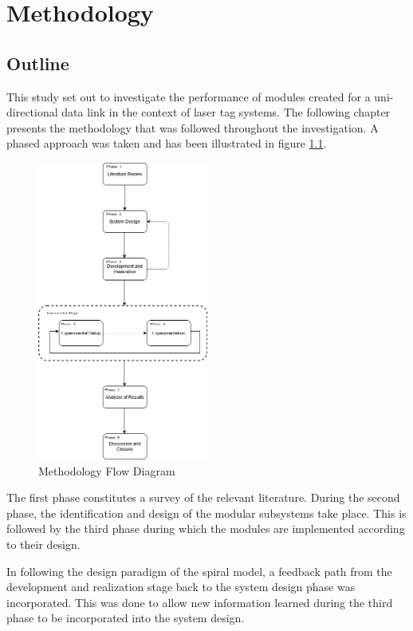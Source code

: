 \chapter{Methodology}
\label{ch_methodology}

\section{Outline}

This study set out to investigate the performance of modules created for a uni-directional data link in the context of laser tag systems. The following chapter presents the methodology that was followed throughout the investigation. A phased approach was taken and has been illustrated in figure \ref{fig:methodology_overview}.

\begin{figure}[H]
	\centering
	\includegraphics[width=0.5\textwidth]{figures/methodology/methodology}
	\caption{Methodology Flow Diagram}
	\label{fig:methodology_overview}
\end{figure}

The first phase constitutes a survey of the relevant literature. During the second phase, the identification and design of the modular subsystems take place. This is followed by the third phase during which the modules are implemented according to their design.

In following the design paradigm of the spiral model, a feedback path from the development and realization stage back to the system design phase was incorporated. This was done to allow new information learned during the third phase to be incorporated into the system design.

